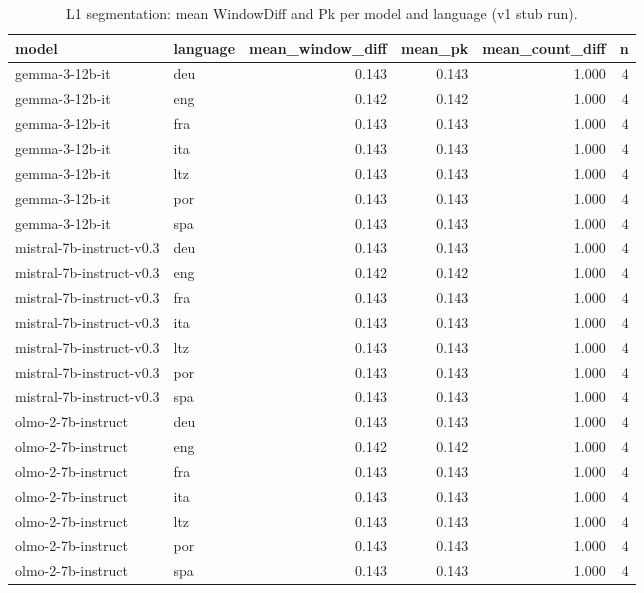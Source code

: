 \begin{table}
\caption{L1 segmentation: mean WindowDiff and Pk per model and language (v1 stub run).}
\label{tab:dinoh-segmentation-v1}
\begin{tabular}{llrrrr}
\toprule
model & language & mean_window_diff & mean_pk & mean_count_diff & n \\
\midrule
gemma-3-12b-it & deu & 0.143 & 0.143 & 1.000 & 4 \\
gemma-3-12b-it & eng & 0.142 & 0.142 & 1.000 & 4 \\
gemma-3-12b-it & fra & 0.143 & 0.143 & 1.000 & 4 \\
gemma-3-12b-it & ita & 0.143 & 0.143 & 1.000 & 4 \\
gemma-3-12b-it & ltz & 0.143 & 0.143 & 1.000 & 4 \\
gemma-3-12b-it & por & 0.143 & 0.143 & 1.000 & 4 \\
gemma-3-12b-it & spa & 0.143 & 0.143 & 1.000 & 4 \\
mistral-7b-instruct-v0.3 & deu & 0.143 & 0.143 & 1.000 & 4 \\
mistral-7b-instruct-v0.3 & eng & 0.142 & 0.142 & 1.000 & 4 \\
mistral-7b-instruct-v0.3 & fra & 0.143 & 0.143 & 1.000 & 4 \\
mistral-7b-instruct-v0.3 & ita & 0.143 & 0.143 & 1.000 & 4 \\
mistral-7b-instruct-v0.3 & ltz & 0.143 & 0.143 & 1.000 & 4 \\
mistral-7b-instruct-v0.3 & por & 0.143 & 0.143 & 1.000 & 4 \\
mistral-7b-instruct-v0.3 & spa & 0.143 & 0.143 & 1.000 & 4 \\
olmo-2-7b-instruct & deu & 0.143 & 0.143 & 1.000 & 4 \\
olmo-2-7b-instruct & eng & 0.142 & 0.142 & 1.000 & 4 \\
olmo-2-7b-instruct & fra & 0.143 & 0.143 & 1.000 & 4 \\
olmo-2-7b-instruct & ita & 0.143 & 0.143 & 1.000 & 4 \\
olmo-2-7b-instruct & ltz & 0.143 & 0.143 & 1.000 & 4 \\
olmo-2-7b-instruct & por & 0.143 & 0.143 & 1.000 & 4 \\
olmo-2-7b-instruct & spa & 0.143 & 0.143 & 1.000 & 4 \\
\bottomrule
\end{tabular}
\end{table}
